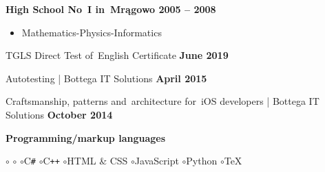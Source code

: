 \documentclass[11pt,a4paper]{article}
\newcommand*\header[1]{
    \noindent\raisebox{.1cm}{\color{MidnightBlue}\rule{1.5cm}{.1cm}\hspace{.2cm}\raisebox{-.1cm}{\large\bf #1}}}
\begin{document}
    {\bf High School No~I in~Mrągowo \hfill 2005 -- 2008}

    \vspace{-.23cm}
    \begin{itemize}[leftmargin=1.5cm] \itemsep.2mm \parskip0mm 
        \item[ ] Mathematics-Physics-Informatics
    \end{itemize}


    \medskip

    \header{Additional qualifications}

    \smallskip

    {TGLS Direct Test of~English Certificate \hfill {\bf June 2019}}

    {Autotesting | Bottega IT Solutions \hfill {\bf April 2015}}

    {Craftsmanship, patterns and~architecture for~iOS developers | Bottega IT Solutions \hfill {\bf October 2014}}


    \bigskip

    \header{Technical skills}


    \smallskip

    {\bf Programming/markup languages}

    \smallskip
    \hspace{.4cm}
    $\circ$\hspace{.18cm}{\bf Objective-C}
    \hspace{.32cm}
    $\circ$\hspace{.18cm}{\bf Swift}
    \hspace{.32cm}
    $\circ$\hspace{.18cm}C\texttt{\#}
    \hspace{.32cm}
    $\circ$\hspace{.18cm}C\texttt{++}
    \hspace{.32cm}
    $\circ$\hspace{.18cm}HTML \& CSS
    \hspace{.32cm}
    $\circ$\hspace{.18cm}JavaScript
    \hspace{.32cm}
    $\circ$\hspace{.18cm}Python
    \hspace{.32cm}
    $\circ$\hspace{.18cm}TeX
\end{document}
